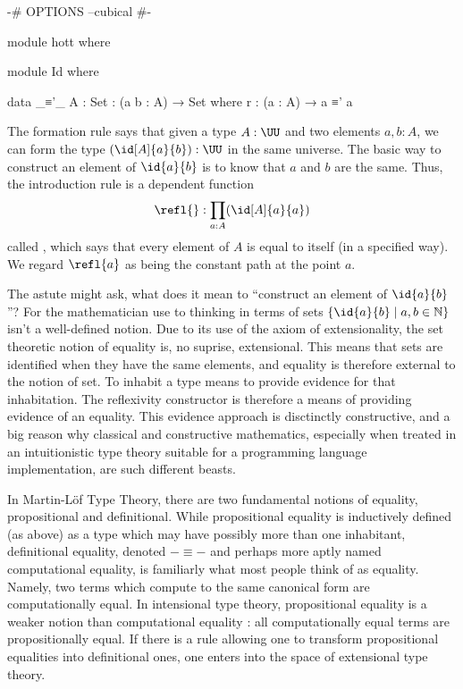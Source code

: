 \begin{code}[hide]
{-# OPTIONS --cubical #-}

module hott where

module Id where
\end{code}
\begin{code}
  data _≡'_ {A : Set} : (a b : A) → Set where
    r : (a : A) → a ≡' a
\end{code}
\begin{definition}
  The formation rule says that given a type $A:\UU$ and two elements $a,b:A$, we can form the type $(\id[A]{a}{b}):\UU$ in the same universe.
  The basic way to construct an element of $\id{a}{b}$ is to know that $a$ and $b$ are the same.
  Thus, the introduction rule is a dependent function
  \[\refl{} : \prod_{a:A} (\id[A]{a}{a}) \]
  called ,
  which says that every element of $A$ is equal to itself (in a specified way).  We regard $\refl{a}$ as being the
  constant path %
  at the point $a$.
\end{definition}


The astute might ask, what
does it mean to ``construct an element of $\id{a}{b}$''? For the mathematician
use to thinking in terms of sets $\{\id{a}{b} \mid a,b \in \mathbb{N} \}$ isn't
a well-defined notion. Due to its use of the axiom of extensionality, the set
theoretic notion of equality is, no suprise, extensional.  This means that sets
are identified when they have the same elements, and equality is therefore
external to the notion of set. To inhabit a type means to provide evidence for
that inhabitation. The reflexivity constructor is therefore a means of
providing evidence of an equality. This evidence approach is disctinctly
constructive, and a big reason why classical and constructive mathematics,
especially when treated in an intuitionistic type theory suitable for a
programming language implementation, are such different beasts.

In Martin-Löf Type Theory, there are two fundamental notions of equality,
propositional and definitional.  While propositional equality is inductively
defined (as above) as a type which may have possibly more than one inhabitant,
definitional equality, denoted $-\equiv -$ and perhaps more aptly named
computational equality, is familiarly what most people think of as equality.
Namely, two terms which compute to the same canonical form are computationally
equal. In intensional type theory, propositional equality is a weaker notion
than computational equality : all computationally equal terms are
propositionally equal. If there is a rule allowing one to transform
propositional equalities into definitional ones, one enters into the space of
extensional type theory. 

